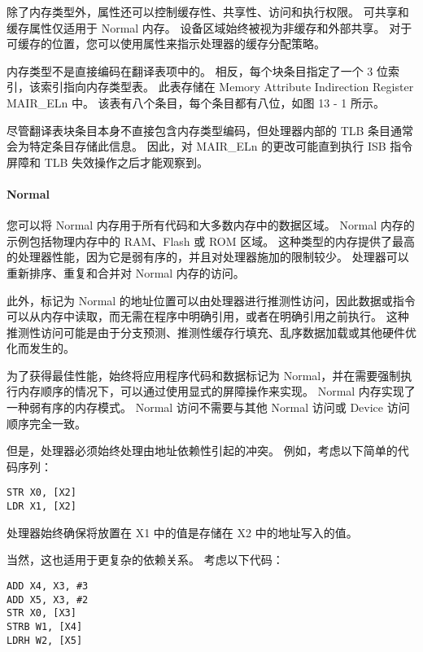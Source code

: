 除了内存类型外，属性还可以控制缓存性、共享性、访问和执行权限。
可共享和缓存属性仅适用于 Normal 内存。
设备区域始终被视为非缓存和外部共享。
对于可缓存的位置，您可以使用属性来指示处理器的缓存分配策略。

内存类型不是直接编码在翻译表项中的。
相反，每个块条目指定了一个 3 位索引，该索引指向内存类型表。
此表存储在 Memory Attribute Indirection Register MAIR\_ELn 中。
该表有八个条目，每个条目都有八位，如图 13 - 1 所示。

尽管翻译表块条目本身不直接包含内存类型编码，但处理器内部的 TLB 条目通常会为特定条目存储此信息。
因此，对 MAIR\_ELn 的更改可能直到执行 ISB 指令屏障和 TLB 失效操作之后才能观察到。


\paragraph*{Normal}

您可以将 Normal 内存用于所有代码和大多数内存中的数据区域。
Normal 内存的示例包括物理内存中的 RAM、Flash 或 ROM 区域。
这种类型的内存提供了最高的处理器性能，因为它是弱有序的，并且对处理器施加的限制较少。
处理器可以重新排序、重复和合并对 Normal 内存的访问。

此外，标记为 Normal 的地址位置可以由处理器进行推测性访问，因此数据或指令可以从内存中读取，而无需在程序中明确引用，或者在明确引用之前执行。
这种推测性访问可能是由于分支预测、推测性缓存行填充、乱序数据加载或其他硬件优化而发生的。

为了获得最佳性能，始终将应用程序代码和数据标记为 Normal，并在需要强制执行内存顺序的情况下，可以通过使用显式的屏障操作来实现。
Normal 内存实现了一种弱有序的内存模式。
Normal 访问不需要与其他 Normal 访问或 Device 访问顺序完全一致。

但是，处理器必须始终处理由地址依赖性引起的冲突。
例如，考虑以下简单的代码序列：

\begin{lstlisting}
STR X0, [X2]
LDR X1, [X2]
\end{lstlisting}

处理器始终确保将放置在 X1 中的值是存储在 X2 中的地址写入的值。

当然，这也适用于更复杂的依赖关系。
考虑以下代码：

\begin{lstlisting}
ADD X4, X3, #3
ADD X5, X3, #2
STR X0, [X3]
STRB W1, [X4]
LDRH W2, [X5]
\end{lstlisting}

